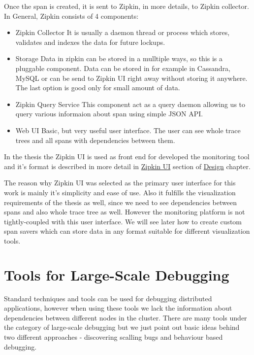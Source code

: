 Once the span is created, it is sent to Zipkin, in more details, to Zipkin collector. In General, Zipkin consists of 4 components:
\begin{itemize}
	\item Zipkin Collector
	It is usually a daemon thread or process which stores, validates and indexes the data for future lockups.
	\item Storage
	Data in zipkin can be stored in a mulltiple ways, so this is a pluggable component. Data can be stored in for example in Cassandra, MySQL or can be send to Zipkin UI right away without storing it anywhere. The last option is good only for small amount of data.
	\item Zipkin Query Service
	This component act as a query daemon allowing us to query various informaion about span using simple JSON API.
	\item Web UI
	Basic, but very useful user interface. The user can see whole trace trees and all spans with dependencies between them.
\end{itemize}
 In the thesis the Zipkin UI is used as front end for developed the monitoring tool and it's format is described in more detail in  \hyperref[sec:zipkin_ui]{Zipkin UI} section of \hyperref[chap:design]{Design} chapter.
 
 The reason why Zipkin UI was selected as the primary user interface for this work is mainly it's simplicity and ease of use. Also it fulfills the visualization requirements of the thesis as well, since we need to see dependencies between spans and also whole trace tree as well. However the monitoring platform is not tightly-coupled with this user interface. We will see later how to create custom span savers which can store data in any format suitable for different visualization tools.
 

\section{Tools for Large-Scale Debugging}
Standard techniques and tools can be used for debugging distributed applications, however when using these tools we lack the information about dependencies between different nodes in the cluster. There are many tools under the category of large-scale debugging but we just point out basic ideas behind two different approaches - discovering scalling bugs and behaviour based debugging. 

